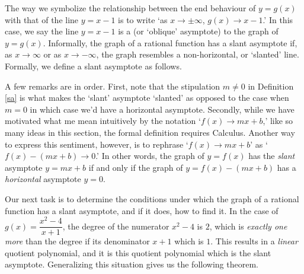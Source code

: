 The way we symbolize the relationship between the end behaviour of $y=g(x)$ with that of the line $y=x-1$ is to write `as $x \rightarrow \pm \infty$, $g(x)  \to x-1$.'  In this case, we say the line $y=x-1$ is a     (or `oblique' asymptote)  to the graph of $y=g(x)$.  Informally, the graph of a rational function has a slant asymptote if, as $x \rightarrow \infty$ or as $x \rightarrow -\infty$, the graph resembles a non-horizontal, or `slanted' line.  Formally, we define a slant asymptote as follows.


\medskip



\medskip


A few remarks are in order.  First, note that the stipulation $m \neq 0$ in Definition \ref{sa} is what makes the `slant' asymptote `slanted' as opposed to the case when $m=0$ in which case we'd have a horizontal asymptote.  Secondly, while we have motivated what me mean intuitively by the notation `$f(x)  \rightarrow mx+b$,' like so many ideas in this section, the formal definition requires Calculus.  Another way to express this sentiment, however, is to rephrase `$f(x)  \rightarrow mx+b$' as `$f(x) - (mx+b) \rightarrow 0$.'  In other words, the graph of $y=f(x)$ has the \textit{slant} asymptote $y = mx+b$ if and only if the graph of $y = f(x) - (mx+b)$ has a \textit{horizontal} asymptote $y=0$.


Our next task is to determine the conditions under which the graph of a rational function has a slant asymptote, and if it does, how to find it.  In the case of $g(x) = \dfrac{x^2-4}{x+1}$, the degree of the numerator $x^2-4$ is $2$, which is \textit{exactly one more} than the degree if its denominator $x+1$ which is $1$.  This results in a \textit{linear} quotient polynomial, and it is this quotient polynomial which is the slant asymptote.  Generalizing this situation gives us the following theorem. 

\medskip


